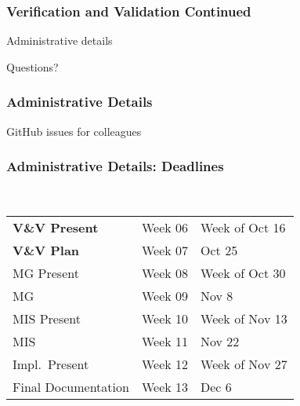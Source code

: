 \documentclass[t,12pt,numbers,fleqn]{beamer}
\begin{document}



\begin{frame}
\frametitle{Verification and Validation Continued}

\bi
\item Administrative details
\item Questions?
\ei
\end{frame}


\begin{frame}
\frametitle{Administrative Details}

\bi
\item GitHub issues for colleagues
\ei

\end{frame}


\begin{frame}
\frametitle{Administrative Details: Deadlines}
~\newline
\begin{tabular}{l l l}
\textbf{V\&V Present} & Week 06 & Week of Oct 16\\
\textbf{V\&V Plan} & Week 07 & Oct 25\\
MG Present & Week 08 & Week of Oct 30\\
MG & Week 09 & Nov 8\\
MIS Present & Week 10 & Week of Nov 13\\
MIS & Week 11 & Nov 22\\
Impl.\ Present & Week 12 & Week of Nov 27\\
Final Documentation & Week 13 & Dec 6\\
\end {tabular}

\end{frame}

\end{document}
